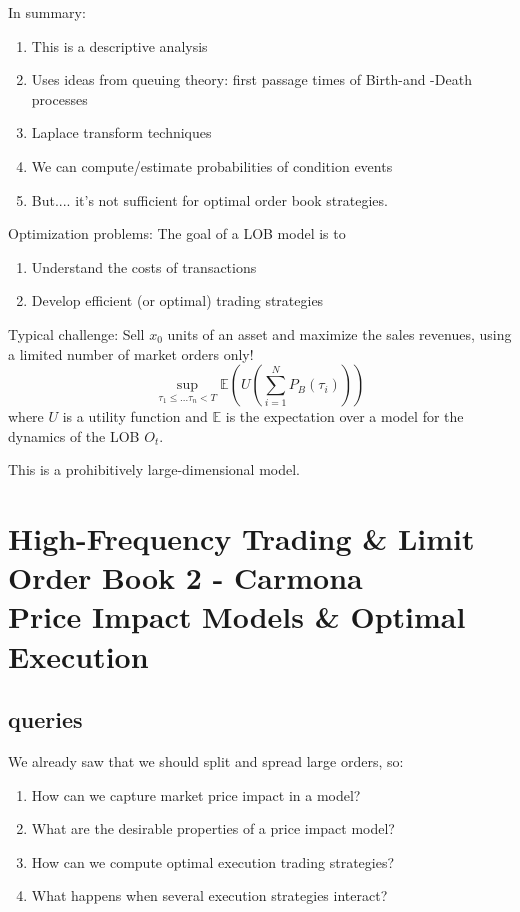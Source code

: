 In summary:
\begin{enumerate}
	\item This is a descriptive analysis
	\item Uses ideas from queuing theory: first passage times of Birth-and -Death processes
	\item Laplace transform techniques
	\item We can compute/estimate probabilities of condition events
	\item But.... it's not sufficient for optimal order book strategies.
\end{enumerate}

Optimization problems: The goal of a LOB model is to
\begin{enumerate}
	\item Understand the costs of transactions
	\item Develop efficient (or optimal) trading strategies
\end{enumerate}

Typical challenge: Sell $x_0$ units of an asset and maximize the sales revenues, using a limited number of market orders only!
\begin{equation}
	\sup_{\tau_1 \leq ... \tau_n < T} \mathbb{E}(U(\sum_{i=1}^N P_B(\tau_i)))
\end{equation}
where $U$ is a utility function and $\mathbb{E}$ is the expectation over a model for the dynamics of the LOB $O_t$.

This is a prohibitively large-dimensional model.

\chapter{High-Frequency Trading \& Limit Order Book 2 - Carmona\\ Price Impact Models \& Optimal Execution}
\section{queries}
We already saw that we should split and spread large orders, so:
\begin{enumerate}
	\item How can we capture market price impact in a model?
	\item What are the desirable properties of a price impact model?
	\item How can we compute optimal execution trading strategies?
	\item What happens when several execution strategies interact?
\end{enumerate}

